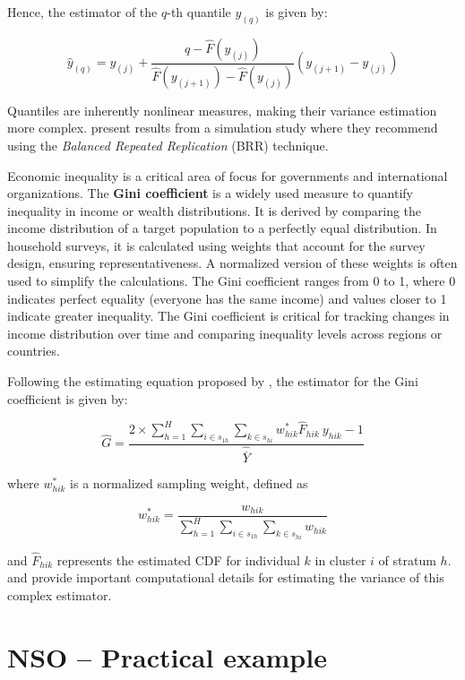 \documentclass[
  12pt,
]{book}
\begin{document}
Hence, the estimator of the \(q\)-th quantile \(y_{(q)}\) is given by:

\[
\widehat{y}_{(q)} = y_{(j)} + \frac{q - \widehat{F}(y_{(j)})}{\widehat{F}(y_{(j+1)}) - \widehat{F}(y_{(j)})} (y_{(j+1)} - y_{(j)})
\]

Quantiles are inherently nonlinear measures, making their variance estimation more complex. \citet{kovar1988bootstrap} present results from a simulation study where they recommend using the \emph{Balanced Repeated Replication} (BRR) technique.

Economic inequality is a critical area of focus for governments and international organizations. The \textbf{Gini coefficient} is a widely used measure to quantify inequality in income or wealth distributions. It is derived by comparing the income distribution of a target population to a perfectly equal distribution. In household surveys, it is calculated using weights that account for the survey design, ensuring representativeness. A normalized version of these weights is often used to simplify the calculations. The Gini coefficient ranges from 0 to 1, where 0 indicates perfect equality (everyone has the same income) and values closer to 1 indicate greater inequality. The Gini coefficient is critical for tracking changes in income distribution over time and comparing inequality levels across regions or countries.

Following the estimating equation proposed by \citet{binder1995estimating}, the estimator for the Gini coefficient is given by:

\[
\widehat{G} = \frac {2 \times \sum_{h=1}^{H} \sum_{i \in s_{1h}} \sum_{k \in s_{hi}}  w_{hik}^{*} \widehat{F}_{hik} \ y_{hik} - 1} {\widehat{\overline{Y}}}
\]

where \(w_{hik}^{*}\) is a normalized sampling weight, defined as

\[
w_{hik}^{*} = \frac{w_{hik}} {\sum_{h=1}^{H} \sum_{i \in s_{1h}}  \sum_{k \in s_{hi}} w_{hik}}
\]

and \(\widehat{F}_{hik}\) represents the estimated CDF for individual \(k\) in cluster \(i\) of stratum \(h\). \citet{osier2009variance} and \citet{Langel_Tille_2013} provide important computational details for estimating the variance of this complex estimator.

\hypertarget{nso-practical-example}{%
\section{NSO -- Practical example}\label{nso-practical-example}}
\end{document}
